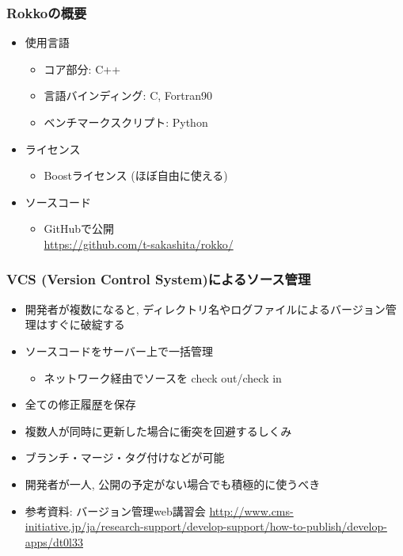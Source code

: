 \begin{frame}
  \frametitle{Rokkoの概要}
  \begin{itemize}
  \item 使用言語
    \begin{itemize}
    \item コア部分: C++
    \item 言語バインディング: C, Fortran90
    \item ベンチマークスクリプト: Python
    \end{itemize}
  \item ライセンス
    \begin{itemize}
    \item Boostライセンス (ほぼ自由に使える)
    \end{itemize}
  \item ソースコード
    \begin{itemize}
    \item GitHubで公開\\
          \url{https://github.com/t-sakashita/rokko/}
    \end{itemize}
  \end{itemize}
\end{frame}

\begin{frame}
  \frametitle{VCS (Version Control System)によるソース管理}
  \begin{itemize}
  \item 開発者が複数になると, ディレクトリ名やログファイルによるバージョン管理はすぐに破綻する
  \item ソースコードをサーバー上で一括管理
    \begin{itemize}
    \item ネットワーク経由でソースを check out/check in
    \end{itemize}
  \item 全ての修正履歴を保存
  \item 複数人が同時に更新した場合に衝突を回避するしくみ
  \item ブランチ・マージ・タグ付けなどが可能
  \item 開発者が一人, 公開の予定がない場合でも積極的に使うべき
  \item 参考資料: バージョン管理web講習会 {\tiny
      \url{http://www.cms-initiative.jp/ja/research-support/develop-support/how-to-publish/develop-apps/dt0l33}}
  \end{itemize}
\end{frame}

